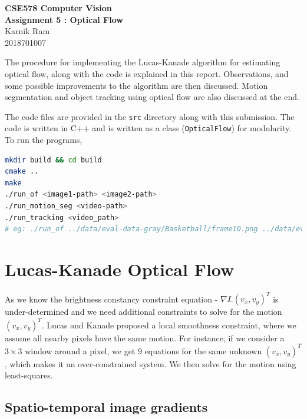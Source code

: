 \documentclass[a4paper,11]{article}
\begin{document}
\begin{center}
  \large{\textbf{CSE578 Computer Vision}}\\
  \Large{\textbf{Assignment 5 : Optical Flow}}\\
  \vspace{1em}
  \large{Karnik Ram\\
  2018701007}
\end{center}

The procedure for implementing the Lucas-Kanade algorithm for estimating optical flow, along with the code is explained in this report. Observations, and some possible improvements to the algorithm are then discussed. Motion segmentation and object tracking using optical flow are also discussed at the end.

The code files are provided in the \texttt{src} directory along with this submission. The code is written in C++ and is written as a class (\texttt{OpticalFlow}) for modularity. To run the programs,

\begin{lstlisting}[language=bash]
mkdir build && cd build
cmake ..
make
./run_of <image1-path> <image2-path>
./run_motion_seg <video-path>
./run_tracking <video_path>
# eg: ./run_of ../data/eval-data-gray/Basketball/frame10.png ../data/eval-data-gray/Basketball/frame11.png
\end{lstlisting}

\section{Lucas-Kanade Optical Flow}
As we know the brightness constancy constraint equation - $ \nabla I.(v_x, v_y)^{T}$ is under-determined and we need additional constraints to solve for the motion $(v_x, v_y)^T$. Lucas and Kanade proposed a local smoothness constraint, where we assume all nearby pixels have the same motion. For instance, if we consider a $3 \times 3$ window around a pixel, we get $9$ equations for the same unknown $(v_x, v_y)^T$, which makes it an over-constrained system. We then solve for the motion using least-squares.

  \subsection{Spatio-temporal image gradients}
  
\end{document}
